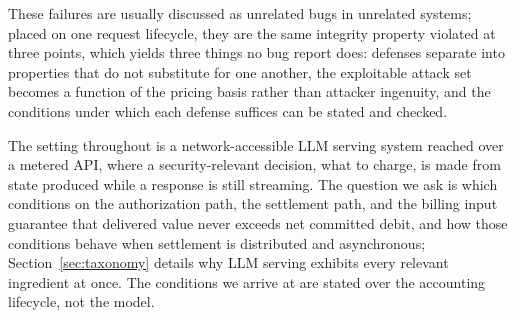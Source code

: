 \documentclass[final,5p,times,twocolumn,number]{elsarticle}
\begin{document}
These failures are usually discussed as unrelated bugs in unrelated systems; placed on one
request lifecycle, they are the same integrity property violated at three points, which
yields three things no bug report does: defenses separate into properties that do not
substitute for one another, the exploitable attack set becomes a function of the pricing
basis rather than attacker ingenuity, and the conditions under which each defense
suffices can be stated and checked.

The setting throughout is a network-accessible LLM serving system reached over a metered
API, where a security-relevant decision, what to charge, is made from state produced
while a response is still streaming. The question we ask is which conditions on the
authorization path, the settlement path, and the billing input guarantee that delivered
value never exceeds net committed debit, and how those conditions behave when settlement
is distributed and asynchronous; Section~\ref{sec:taxonomy} details why LLM serving
exhibits every relevant ingredient at once. The conditions we arrive at are stated over
the accounting lifecycle, not the model.
\end{document}
